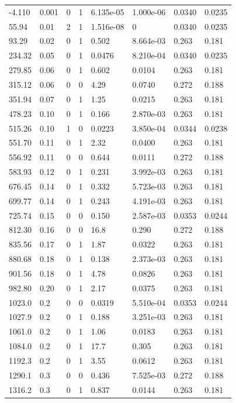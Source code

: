 \documentclass[preview]{standalone}
\begin{document}
{{\begin{tabular}{L{1.2cm}C{1.2cm} C{0.3cm}C{0.5cm} C{1.4cm}C{1.4cm} C{1.4cm}C{1.4cm}}
  -4.110  &  0.001  & 0     &  1 &  6.135e-05  & 1.000e-06  & 0.0340 &  0.0235   \\ 
  55.94  &  0.01  & 2     &  1 &  1.516e-08  & 0  & 0.0340 &  0.0235   \\ 
  93.29  &  0.02  & 0     &  1 &  0.502  & 8.664e-03  & 0.263 &  0.181   \\ 
  234.32  &  0.05  & 0     &  1 &  0.0476  & 8.210e-04  & 0.0340 &  0.0235   \\ 
  279.85  &  0.06  & 0     &  1 &  0.602  & 0.0104  & 0.263 &  0.181   \\ 
  315.12  &  0.06  & 0     &  0 &  4.29  & 0.0740  & 0.272 &  0.188   \\ 
  351.94  &  0.07  & 0     &  1 &  1.25  & 0.0215  & 0.263 &  0.181   \\ 
  478.23  &  0.10  & 0     &  1 &  0.166  & 2.870e-03  & 0.263 &  0.181   \\ 
  515.26  &  0.10  & 1     &  0 &  0.0223  & 3.850e-04  & 0.0344 &  0.0238   \\ 
  551.70  &  0.11  & 0     &  1 &  2.32  & 0.0400  & 0.263 &  0.181   \\ 
  556.92  &  0.11  & 0     &  0 &  0.644  & 0.0111  & 0.272 &  0.188   \\ 
  583.93  &  0.12  & 0     &  1 &  0.231  & 3.992e-03  & 0.263 &  0.181   \\ 
  676.45  &  0.14  & 0     &  1 &  0.332  & 5.723e-03  & 0.263 &  0.181   \\ 
  699.77  &  0.14  & 0     &  1 &  0.243  & 4.191e-03  & 0.263 &  0.181   \\ 
  725.74  &  0.15  & 0     &  0 &  0.150  & 2.587e-03  & 0.0353 &  0.0244   \\ 
  812.30  &  0.16  & 0     &  0 &  16.8  & 0.290  & 0.272 &  0.188   \\ 
  835.56  &  0.17  & 0     &  1 &  1.87  & 0.0322  & 0.263 &  0.181   \\ 
  880.68  &  0.18  & 0     &  1 &  0.138  & 2.373e-03  & 0.263 &  0.181   \\ 
  901.56  &  0.18  & 0     &  1 &  4.78  & 0.0826  & 0.263 &  0.181   \\ 
  982.80  &  0.20  & 0     &  1 &  2.17  & 0.0375  & 0.263 &  0.181   \\ 
  1023.0  &   0.2  & 0     &  0 &  0.0319  & 5.510e-04  & 0.0353 &  0.0244   \\ 
  1027.9  &   0.2  & 0     &  1 &  0.188  & 3.251e-03  & 0.263 &  0.181   \\ 
  1061.0  &   0.2  & 0     &  1 &  1.06  & 0.0183  & 0.263 &  0.181   \\ 
  1084.0  &   0.2  & 0     &  1 &  17.7  & 0.305  & 0.263 &  0.181   \\ 
  1192.3  &   0.2  & 0     &  1 &  3.55  & 0.0612  & 0.263 &  0.181   \\ 
  1290.1  &   0.3  & 0     &  0 &  0.436  & 7.525e-03  & 0.272 &  0.188   \\ 
  1316.2  &   0.3  & 0     &  1 &  0.837  & 0.0144  & 0.263 &  0.181   \\ 
\hline 
\end{tabular} 

}}
\end{document}
